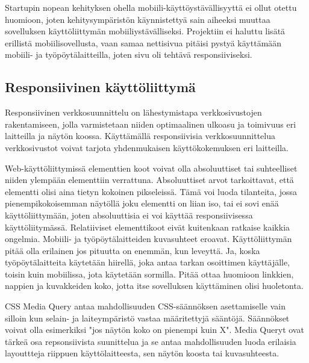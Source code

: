

Startupin nopean kehityksen ohella mobiili-käyttöystävällisyyttä ei ollut otettu huomioon, 
joten kehitysympäristön käynnistettyä sain aiheeksi muuttaa sovelluksen käyttöliittymän mobiiliystävälliseksi.
Projektiin ei haluttu lisätä erillistä mobiilisovellusta, vaan samaa nettisivua pitäisi pystyä käyttämään mobiili- ja työpöytälaitteilla, joten sivu oli tehtävä responsiiviseksi.\medskip





\subsection*{Responsiivinen käyttöliittymä}




Responsiivinen verkkosuunnittelu on lähestymistapa verkkosivustojen rakentamiseen, jolla varmistetaan niiden optimaalinen ulkoasu ja toimivuus eri laitteilla ja näytön koossa.
Käyttämällä responsiivisia verkkosuunnittelua verkkosivustot voivat tarjota yhdenmukaisen käyttökokemuksen eri laitteilla.
\medskip


Web-käyttöliittymissä elementtien koot voivat olla absoluuttiset tai suhteelliset niiden ylempään elementtiin verrattuna. Absoluuttiset arvot tarkoittavat, että elementti olisi aina tietyn kokoinen pikseleissä. 
Tämä voi luoda tilanteita, jossa pienempikokoisemman näytöllä joku elementti on liian iso, tai ei sovi enää käyttöliittymään, joten absoluuttisia ei voi käyttää responsiivisessa käyttöliitymässä.
Relatiiviset elementtikoot eivät kuitenkaan ratkaise kaikkia ongelmia. Mobiili- ja työpöytälaitteiden kuvasuhteet eroavat. Käyttöliittymän pitää olla erilainen jos pituutta on enemmän, kun leveyttä. 
Ja, koska työpöytälaitteita käytetään hiirellä, joka antaa tarkan osoittimen käyttäjälle, toisin kuin mobiilissa, jota käytetään sormilla. 
Pitää ottaa huomioon linkkien, nappien ja kuvakkeiden koko, jotta itse sovelluksen käyttäminen olisi huoletonta.\medskip






CSS Media Query antaa mahdollisuuden CSS-säännöksen asettamiselle vain silloin kun selain- ja laiteympäristö vastaa määritettyjä sääntöjä. 
Säännökset voivat olla esimerkiksi "jos näytön koko on pienempi kuin X".
Media Queryt ovat tärkeä osa repsonsiivista suunittelua ja se antaa mahdollisuuden luoda erilaisia layouttteja riippuen käyttölaitteesta, sen näytön koosta tai kuvasuhteesta.
\medskip












